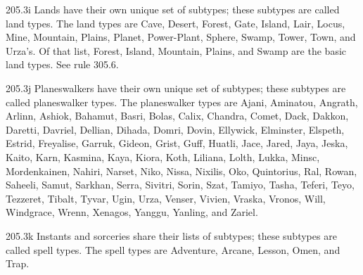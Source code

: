 205.3i Lands have their own unique set of subtypes; these subtypes are called land types. The land types are Cave, Desert, Forest, Gate, Island, Lair, Locus, Mine, Mountain, Plains, Planet, Power-Plant, Sphere, Swamp, Tower, Town, and Urza’s. Of that list, Forest, Island, Mountain, Plains, and Swamp are the basic land types. See rule 305.6.

205.3j Planeswalkers have their own unique set of subtypes; these subtypes are called planeswalker types. The planeswalker types are Ajani, Aminatou, Angrath, Arlinn, Ashiok, Bahamut, Basri, Bolas, Calix, Chandra, Comet, Dack, Dakkon, Daretti, Davriel, Dellian, Dihada, Domri, Dovin, Ellywick, Elminster, Elspeth, Estrid, Freyalise, Garruk, Gideon, Grist, Guff, Huatli, Jace, Jared, Jaya, Jeska, Kaito, Karn, Kasmina, Kaya, Kiora, Koth, Liliana, Lolth, Lukka, Minsc, Mordenkainen, Nahiri, Narset, Niko, Nissa, Nixilis, Oko, Quintorius, Ral, Rowan, Saheeli, Samut, Sarkhan, Serra, Sivitri, Sorin, Szat, Tamiyo, Tasha, Teferi, Teyo, Tezzeret, Tibalt, Tyvar, Ugin, Urza, Venser, Vivien, Vraska, Vronos, Will, Windgrace, Wrenn, Xenagos, Yanggu, Yanling, and Zariel.

205.3k Instants and sorceries share their lists of subtypes; these subtypes are called spell types. The spell types are Adventure, Arcane, Lesson, Omen, and Trap.

